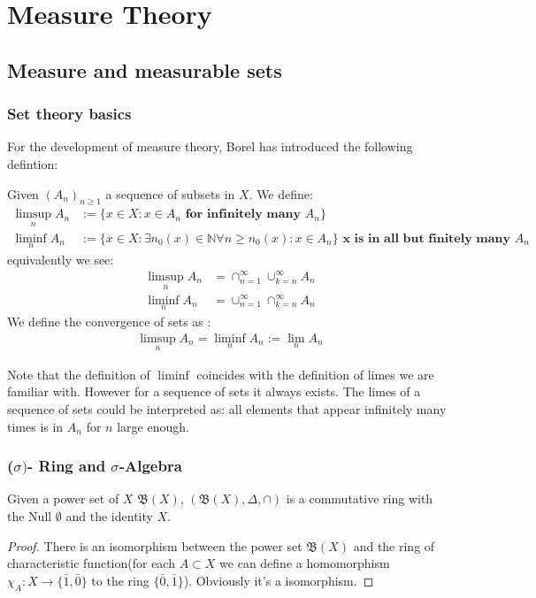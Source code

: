 \chapter{Measure Theory}
\section{Measure and measurable sets}

\subsection{Set theory basics}
For the development of measure theory, Borel has introduced the following defintion:
\begin{definition}
	Given $(A_n)_{n \geq 1}$ a sequence of subsets in $X$. We define:
	\begin{align*}
		\limsup_n A_n &:= \{ x \in X: x \in A_n \textbf{ for infinitely many } A_n \}\\
		\liminf_n A_n &:= \{ x \in X: \exists n_0(x) \in \mathbb{N}\forall n \geq n_0(x): x \in A_n \} \textbf{ x is in all but finitely many $A_n$}
	\end{align*}
	equivalently we see:
	\begin{align*}
		\limsup_n A_n &= \cap_{n = 1}^\infty \cup_{k = n}^\infty A_n\\ 
		\liminf_n A_n &= \cup_{n = 1}^\infty \cap_{k = n}^\infty A_n
	\end{align*}
	We define the convergence of sets as :
	\begin{align*}
		\limsup_n A_n = \liminf_n A_n := \lim_n A_n
	\end{align*}
\end{definition}
Note that the definition of $\liminf$ coincides with the definition of limes we are familiar with. However for a sequence of sets it always exists. The limes of a sequence of sets could be interpreted as: all elements that appear infinitely many times is in $A_n$ for $n$ large enough.


\subsection{($\sigma)$- Ring and $\sigma$-Algebra}
\begin{theorem}
	Given a power set of $X$ $\mathfrak{B}(X)$, $(\mathfrak{B}(X), \Delta, \cap)$ is a commutative ring with the Null $\emptyset$ and the identity $X$.
\end{theorem}
\begin{proof}
	There is an isomorphism between the power set $\mathfrak{B}(X)$ and the ring of characteristic function(for each $A \subset X$ we can define a homomorphism $\chi_A: X \rightarrow \{\bar{1}, \bar{0} \}$ to the ring $\{\bar{0}, \bar{1}\}$). Obviously it's a isomorphism.
\end{proof}

